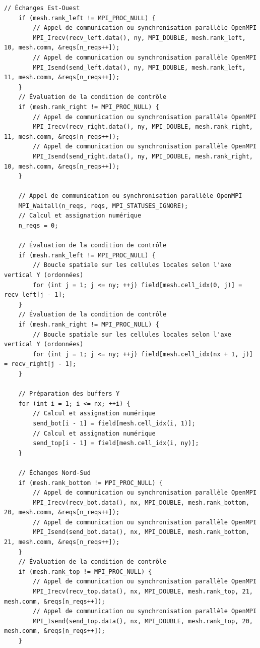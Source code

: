 \documentclass[10pt,a4paper,oneside]{book}
\begin{document}
\begin{lstlisting}[language={[11]C++}]
    // Échanges Est-Ouest
    if (mesh.rank_left != MPI_PROC_NULL) {
        // Appel de communication ou synchronisation parallèle OpenMPI
        MPI_Irecv(recv_left.data(), ny, MPI_DOUBLE, mesh.rank_left, 10, mesh.comm, &reqs[n_reqs++]);
        // Appel de communication ou synchronisation parallèle OpenMPI
        MPI_Isend(send_left.data(), ny, MPI_DOUBLE, mesh.rank_left, 11, mesh.comm, &reqs[n_reqs++]);
    }
    // Évaluation de la condition de contrôle
    if (mesh.rank_right != MPI_PROC_NULL) {
        // Appel de communication ou synchronisation parallèle OpenMPI
        MPI_Irecv(recv_right.data(), ny, MPI_DOUBLE, mesh.rank_right, 11, mesh.comm, &reqs[n_reqs++]);
        // Appel de communication ou synchronisation parallèle OpenMPI
        MPI_Isend(send_right.data(), ny, MPI_DOUBLE, mesh.rank_right, 10, mesh.comm, &reqs[n_reqs++]);
    }

    // Appel de communication ou synchronisation parallèle OpenMPI
    MPI_Waitall(n_reqs, reqs, MPI_STATUSES_IGNORE);
    // Calcul et assignation numérique
    n_reqs = 0;

    // Évaluation de la condition de contrôle
    if (mesh.rank_left != MPI_PROC_NULL) {
        // Boucle spatiale sur les cellules locales selon l'axe vertical Y (ordonnées)
        for (int j = 1; j <= ny; ++j) field[mesh.cell_idx(0, j)] = recv_left[j - 1];
    }
    // Évaluation de la condition de contrôle
    if (mesh.rank_right != MPI_PROC_NULL) {
        // Boucle spatiale sur les cellules locales selon l'axe vertical Y (ordonnées)
        for (int j = 1; j <= ny; ++j) field[mesh.cell_idx(nx + 1, j)] = recv_right[j - 1];
    }

    // Préparation des buffers Y
    for (int i = 1; i <= nx; ++i) {
        // Calcul et assignation numérique
        send_bot[i - 1] = field[mesh.cell_idx(i, 1)];
        // Calcul et assignation numérique
        send_top[i - 1] = field[mesh.cell_idx(i, ny)];
    }

    // Échanges Nord-Sud
    if (mesh.rank_bottom != MPI_PROC_NULL) {
        // Appel de communication ou synchronisation parallèle OpenMPI
        MPI_Irecv(recv_bot.data(), nx, MPI_DOUBLE, mesh.rank_bottom, 20, mesh.comm, &reqs[n_reqs++]);
        // Appel de communication ou synchronisation parallèle OpenMPI
        MPI_Isend(send_bot.data(), nx, MPI_DOUBLE, mesh.rank_bottom, 21, mesh.comm, &reqs[n_reqs++]);
    }
    // Évaluation de la condition de contrôle
    if (mesh.rank_top != MPI_PROC_NULL) {
        // Appel de communication ou synchronisation parallèle OpenMPI
        MPI_Irecv(recv_top.data(), nx, MPI_DOUBLE, mesh.rank_top, 21, mesh.comm, &reqs[n_reqs++]);
        // Appel de communication ou synchronisation parallèle OpenMPI
        MPI_Isend(send_top.data(), nx, MPI_DOUBLE, mesh.rank_top, 20, mesh.comm, &reqs[n_reqs++]);
    }


\end{lstlisting}
\end{document}
